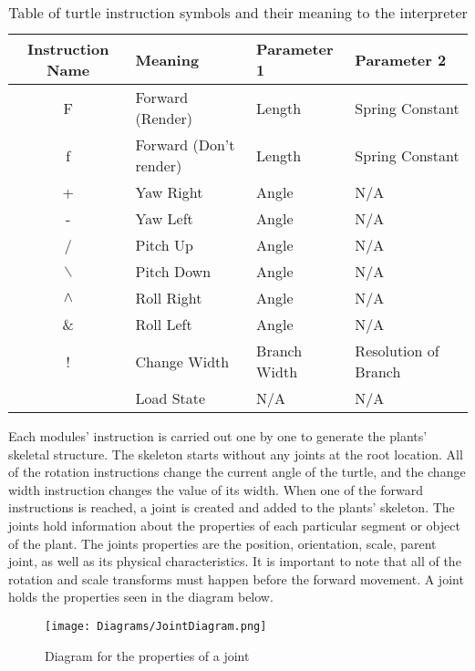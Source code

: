 \begin{table}[h!]
\centering
\begin{tabular}{ | c | l | l | l |}
\hline
	Instruction Name  & Meaning					& Parameter 1 	& Parameter 2 					\\  
\hline
\hline
	F 				&	Forward (Render)		& Length		& Spring Constant				\\
\hline
	f 				&	Forward (Don't render)	& Length 		& Spring Constant				\\
\hline
	+ 				&	Yaw	Right				& Angle 		&	N/A							\\
\hline
	- 				&	Yaw Left				& Angle			&	N/A							\\
\hline
	/ 				&	Pitch Up				& Angle			&	N/A							\\
\hline
	$\backslash$ 	&	Pitch Down				& Angle			&	N/A							\\
\hline
	$\land$ 		&	Roll Right				& Angle			&	N/A							\\
\hline
	\& 				&	Roll Left				& Angle 		&	N/A							\\
\hline
	! 				&	Change Width			& Branch Width	&	Resolution of Branch		\\
\hline
	[ 				&	Save State				& N/A			&	N/A							\\
\hline
	] 				&	Load State				& N/A 			&	N/A							\\
\hline
\end{tabular}
\caption{Table of turtle instruction symbols and their meaning to the interpreter}
\label{instruction table 1}
\end{table}
\FloatBarrier

\noindent
Each modules' instruction is carried out one by one to generate the plants' skeletal structure. The skeleton starts without any joints at the root location. All of the rotation instructions change the current angle of the turtle, and the change width instruction changes the value of its width. When one of the forward instructions is reached, a joint is created and added to the plants' skeleton. The joints hold information about the properties of each particular segment or object of the plant. The joints properties are the position, orientation, scale, parent joint, as well as its physical characteristics. It is important to note that all of the rotation and scale transforms must happen before the forward movement. A joint holds the properties seen in the diagram below.

\begin{figure}[htbp]
	{\centering
		\vspace{7px}
		\texttt{[image: Diagrams/JointDiagram.png]}
		\caption{Diagram for the properties of a joint} \label{joint properties}
	}
\end{figure}
\FloatBarrier

